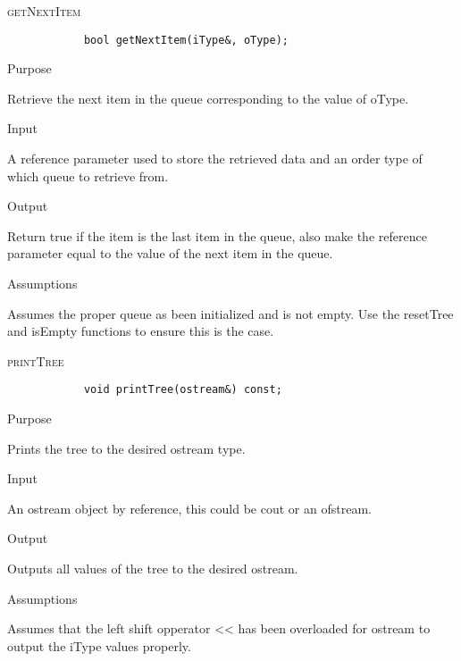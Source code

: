 \documentclass[pdftex, 12pt]{article}
\begin{document}
\begin{description}
\begin{description}
		\end{description}
	\item{\textsc{getNextItem}}
		\begin{lstlisting}
			bool getNextItem(iType&, oType);
		\end{lstlisting}
		\begin{description}

			\item{Purpose}

				Retrieve the next item in the queue corresponding to the value of oType.

			\item{Input}

				A reference parameter used to store the retrieved data and an order type of which queue to retrieve
				from.

			\item{Output}

				Return true if the item is the last item in the queue, also make the reference parameter equal to the
				value of the next item in the queue.

			\item{Assumptions}

				Assumes the proper queue as been initialized and is not empty.  Use the resetTree and isEmpty functions
				to ensure this is the case.

		\end{description}
	\item{\textsc{printTree}}
		\begin{lstlisting}
			void printTree(ostream&) const;
		\end{lstlisting}
		\begin{description}

			\item{Purpose}

				Prints the tree to the desired ostream type.

			\item{Input}

				An ostream object by reference, this could be cout or an ofstream.

			\item{Output}

				Outputs all values of the tree to the desired ostream.

			\item{Assumptions}

				Assumes that the left shift opperator << has been overloaded for ostream to output the iType values
				properly.


\end{description}
\end{description}
\end{document}
